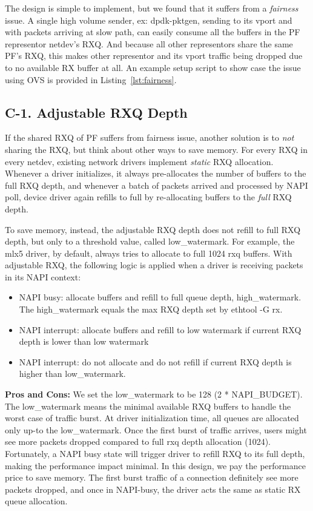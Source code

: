 \documentclass[letterpaper]{article}
\begin{document}
The design is simple to implement, but we found that it suffers from
a \emph{fairness} issue. A single high volume sender, ex: dpdk-pktgen,
sending to its vport and with packets arriving at slow path, can easily
consume all the buffers in the PF representor netdev's RXQ.
And because all other representors share the same PF's RXQ, this makes
other representor and its vport traffic being dropped due to no
available RX buffer at all. An example setup script to show case the issue
using OVS is provided in Listing~\ref{lst:fairness}.

\subsection{C-1. Adjustable RXQ Depth}
If the shared RXQ of PF suffers from fairness issue, another solution is to
{\em not} sharing the RXQ, but think about other ways to save memory.
For every RXQ in every netdev, existing network drivers implement \emph{static}
RXQ allocation.  Whenever a driver initializes, it always pre-allocates the number
of buffers to the full RXQ depth, and whenever a batch of packets arrived and
processed by NAPI poll, device driver again refills to full by re-allocating
buffers to the \emph{full} RXQ depth.

To save memory, instead, the adjustable RXQ depth does not refill to full
RXQ depth, but only to a threshold value, called low\_watermark.
For example, the mlx5 driver, by default, always tries to allocate to
full 1024 rxq buffers. With adjustable RXQ, the following logic is applied
when a driver is receiving packets in its NAPI context:
\begin{itemize}
    \item NAPI busy: allocate buffers and refill to full queue depth, high\_watermark.
    The high\_watermark equals the max RXQ depth set by ethtool -G rx.
    \item NAPI interrupt: allocate buffers and refill to low watermark if
    current RXQ depth is lower than low watermark
    \item NAPI interrupt: do not allocate and do not refill if current
    RXQ depth is higher than low\_watermark.
\end{itemize}

\textbf{Pros and Cons: }
We set the low\_watermark to be 128 (2 * NAPI\_BUDGET). 
The low\_watermark means the minimal available RXQ buffers to handle the
worst case of traffic burst. At driver initialization time, all queues
are allocated only up-to the low\_watermark. Once the first burst
of traffic arrives, users might see more packets dropped compared
to full rxq depth allocation (1024). Fortunately, a NAPI busy state will
trigger driver to refill RXQ to its full depth, making the performance
impact minimal. In this design, we pay the performance price to save
memory. The first burst traffic of a connection definitely see more
packets dropped, and once in NAPI-busy, the driver acts the same as
static RX queue allocation.
\end{document}
